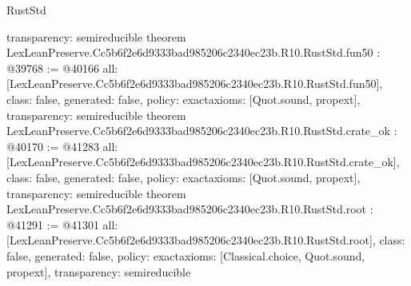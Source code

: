 \begin{lexlean}{RustStd}
\begin{coremodule}
{  transparency: semireducible
}
theorem LexLeanPreserve.Cc5b6f2e6d9333bad985206c2340ec23b.R10.RustStd.fun50 : @39768 := @40166 {
  all: [LexLeanPreserve.Cc5b6f2e6d9333bad985206c2340ec23b.R10.RustStd.fun50],
  class: false,
  generated: false,
  policy: exact{axioms: [Quot.sound, propext]},
  transparency: semireducible
}
theorem LexLeanPreserve.Cc5b6f2e6d9333bad985206c2340ec23b.R10.RustStd.crate_ok : @40170 := @41283 {
  all: [LexLeanPreserve.Cc5b6f2e6d9333bad985206c2340ec23b.R10.RustStd.crate_ok],
  class: false,
  generated: false,
  policy: exact{axioms: [Quot.sound, propext]},
  transparency: semireducible
}
theorem LexLeanPreserve.Cc5b6f2e6d9333bad985206c2340ec23b.R10.RustStd.root : @41291 := @41301 {
  all: [LexLeanPreserve.Cc5b6f2e6d9333bad985206c2340ec23b.R10.RustStd.root],
  class: false,
  generated: false,
  policy: exact{axioms: [Classical.choice, Quot.sound, propext]},
  transparency: semireducible
}


\end{coremodule}
\end{lexlean}

